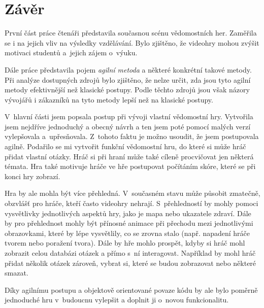 \documentclass[12pt]{report}
\begin{document}
\chapter*{Závěr}

První část práce čtenáři představila současnou scénu vědomostních her. Zaměřila se i na jejich vliv na výsledky vzdělávání. Bylo zjištěno, že videohry mohou zvýšit motivaci studentů a~jejich zájem o~výuku. 

Dále práce představila pojem \textit{agilní metoda} a některé konkrétní takové metody. Při analýze dostupných zdrojů bylo zjištěno, že nelze určit, zda jsou tyto agilní metody efektivnější než klasické postupy. Podle těchto zdrojů jsou však názory vývojářů i zákazníků na tyto metody lepší než na klasické postupy.

V~hlavní části jsem popsala postup při vývoji vlastní vědomostní hry. Vytvořila jsem nejdříve jednoduchý a obecný návrh a ten jsem poté pomocí malých verzí vylepšovala a~upřesňovala. Z~tohoto faktu je možno usoudit, že jsem postupovala agilně. Podařilo se mi vytvořit funkční vědomostní hru, do které si může hráč přidat vlastní otázky. Hráč si při hraní může také cíleně procvičovat jen některá témata. Hra také motivuje hráče ve hře postupovat počítáním skóre, které se při konci hry zobrazí.

Hra by ale mohla být více přehledná. V~současném stavu může působit zmatečně, obzvlášť pro hráče, kteří často videohry nehrají. S~přehledností by mohly pomoci vysvětlivky jednotlivých aspektů hry, jako je mapa nebo ukazatele zdraví. Dále by pro přehlednost mohly být přínosné animace při přechodu mezi jednotlivými obrazovkami, které by lépe vysvětlily, co se zrovna stalo (např. napadení hráče tvorem nebo poražení tvora). Dále by hře mohlo prospět, kdyby si hráč mohl zobrazit celou databázi otázek a přímo s~ní interagovat. Například by mohl hráč přidat několik otázek zároveň, vybrat si, které se budou zobrazovat nebo některé smazat.

Díky agilnímu postupu a objektově orientované povaze kódu by ale bylo poměrně jednoduché hru v~budoucnu vylepšit a doplnit ji o~novou funkcionalitu.
\end{document}
